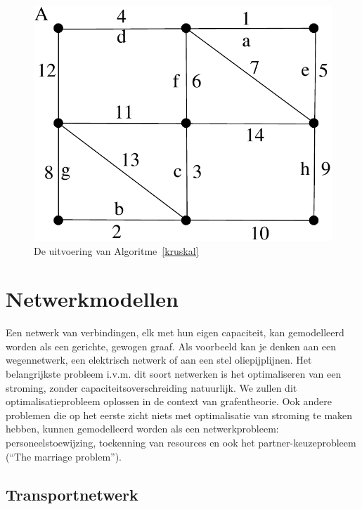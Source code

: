 \begin{figure}[ht]
\begin{center}
\includegraphics[width=0.3\linewidth,keepaspectratio]{kruskal1} %
\end{center}
\caption{De uitvoering van Algoritme~\ref{kruskal} \label{kruskal1}}
\end{figure}


\newpage
\section{Netwerkmodellen}

Een netwerk van verbindingen, elk met hun eigen capaciteit, kan
gemodelleerd worden als een gerichte, gewogen graaf. Als voorbeeld kan
je denken aan een wegennetwerk, een elektrisch netwerk of aan een stel
oliepijplijnen. Het belangrijkste probleem i.v.m. dit soort netwerken
is het optimaliseren van een stroming, zonder capaciteitsoverschreiding
natuurlijk. We zullen dit optimalisatieprobleem oplossen in de context
van grafentheorie. Ook andere problemen die op het eerste zicht niets
met optimalisatie van stroming te maken hebben, kunnen gemodelleerd
worden als een netwerkprobleem: personeelstoewijzing, toekenning van
resources en ook het partner-keuzeprobleem (``The marriage
problem''). 

\subsection{Transportnetwerk}


